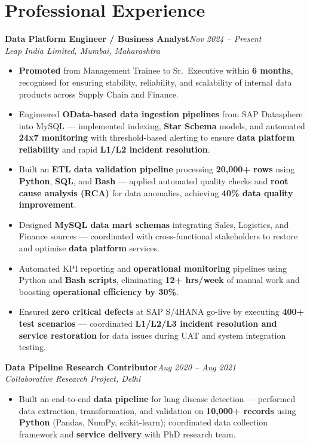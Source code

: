 \documentclass[10pt, letterpaper]{article}
\newcommand{\role}[3]{%
  \vspace{2pt}%
  {\bfseries #1}\hfill{\small\color{muted}\textit{#3}}\\[-2pt]%
  {\small\color{muted}\textit{#2}}%
}
\begin{document}
\section{Professional Experience}

\role{Data Platform Engineer / Business Analyst}{Leap India Limited, Mumbai, Maharashtra}{Nov 2024 -- Present}

\begin{itemize}
  \item \textbf{Promoted} from Management Trainee to Sr.\ Executive within \textbf{6 months}, recognised for ensuring stability, reliability, and scalability of internal data products across Supply Chain and Finance.
  \item Engineered \textbf{OData-based data ingestion pipelines} from SAP Datasphere into MySQL — implemented indexing, \textbf{Star Schema} models, and automated \textbf{24x7 monitoring} with threshold-based alerting to ensure \textbf{data platform reliability} and rapid \textbf{L1/L2 incident resolution}.
  \item Built an \textbf{ETL data validation pipeline} processing \textbf{20,000+ rows} using \textbf{Python}, \textbf{SQL}, and \textbf{Bash} — applied automated quality checks and \textbf{root cause analysis (RCA)} for data anomalies, achieving \textbf{40\% data quality improvement}.
  \item Designed \textbf{MySQL data mart schemas} integrating Sales, Logistics, and Finance sources — coordinated with cross-functional stakeholders to restore and optimise \textbf{data platform} services.
  \item Automated KPI reporting and \textbf{operational monitoring} pipelines using Python and \textbf{Bash scripts}, eliminating \textbf{12+ hrs/week} of manual work and boosting \textbf{operational efficiency by 30\%}.
  \item Ensured \textbf{zero critical defects} at SAP S/4HANA go-live by executing \textbf{400+ test scenarios} — coordinated \textbf{L1/L2/L3 incident resolution and service restoration} for data issues during UAT and system integration testing.
\end{itemize}

\vspace{1pt}

\role{Data Pipeline Research Contributor}{Collaborative Research Project, Delhi}{Aug 2020 -- Aug 2021}

\begin{itemize}
  \item Built an end-to-end \textbf{data pipeline} for lung disease detection — performed data extraction, transformation, and validation on \textbf{10,000+ records} using \textbf{Python} (Pandas, NumPy, scikit-learn); coordinated data collection framework and \textbf{service delivery} with PhD research team.
\end{itemize}
\end{document}
